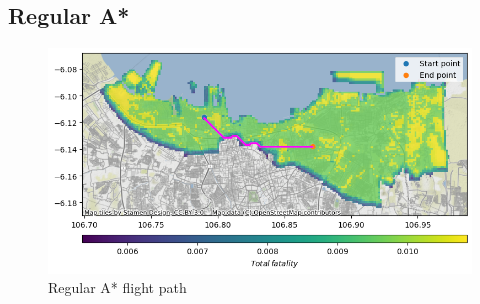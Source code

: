 \documentclass[12pt]{report}
\begin{document}
        \subsection{Regular A*}
        \begin{figure}[H]
            \centering
            \includegraphics[width=\textwidth]{Plot/base astar with risk.png}
            \caption{Regular A* flight path}
        \end{figure}
\end{document}
